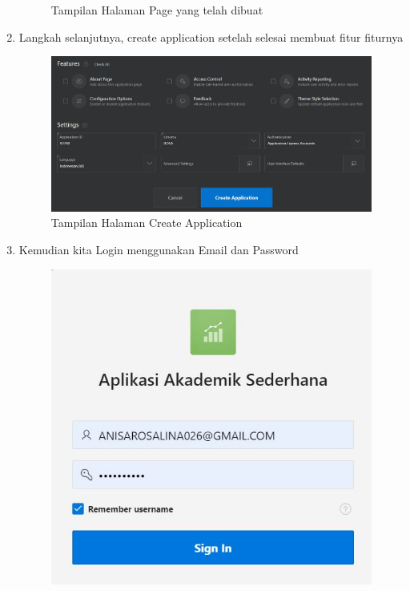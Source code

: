 \begin{enumerate}
\begin{figure}[!htbp]
\begin{center}
    \caption{Tampilan Halaman Page yang telah dibuat}
    \end{center}   
    \end{figure} 
\item Langkah selanjutnya, create application setelah  selesai membuat fitur fiturnya
    \begin{figure}[!htbp]
    \begin{center}
    \includegraphics[scale=0.5]{section/ICA48.JPG}
    \caption{Tampilan Halaman Create Application}
    \end{center}   
    \end{figure} 
\item Kemudian kita Login menggunakan Email dan Password
    \begin{figure}[!htbp]
    \begin{center}
    \includegraphics[scale=0.7]{section/ica50.JPG}

\end{center}
\end{figure}
\end{enumerate}
